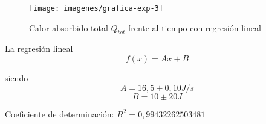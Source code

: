 \documentclass[a4paper,12pt,spanish]{article}
\begin{document}
		
\begin{figure}[H]
	\centering
	\texttt{[image: imagenes/grafica-exp-3]}
	\caption{Calor absorbido total $Q_{tot}$ frente al tiempo con regresión lineal}
	\label{fig:exp3}
\end{figure}


La regresión lineal
\[f(x) = Ax + B
\]

siendo 
\[ A = 16,5 \pm 0,10 \si{J/s}
\]
\[B = 10 \pm 20 \si{J}
\]

Coeficiente de determinación: $R^2 = 0,99432262503481$

\end{document}
